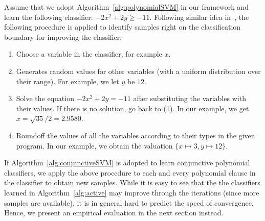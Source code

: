 Assume that we adopt Algorithm~\ref{alg:polynomialSVM} in our framework and learn the following classifier: $-2x^2+2y \geq -11$. Following similar idea in~\cite{DBLP:conf/icml/OrabonaC11}, the following procedure is applied to identify samples right on the classification boundary for improving the classifier.
\begin{enumerate}
\item Choose a variable in the classifier, for example $x$.
\item Generates random values for other variables (with a uniform distribution over their range). For example, we let $y$ be $12$.
\item Solve the equation $-2x^2+2y = -11$ after substituting the variables with their values. If there is no solution, go back to (1). In our example, we get $x = \sqrt{35}/2 = 2.9580$.
\item Roundoff the values of all the variables according to their types in the given program. In our example, we obtain the valuation $\{x \mapsto 3, y \mapsto 12\}$.
\end{enumerate}
If Algorithm~\ref{alg:conjunctiveSVM} is adopted to learn conjunctive polynomial classifiers, we apply the above procedure to each and every polynomial clause in the classifier to obtain new samples. While it is easy to see that the the classifiers learned in Algorithm~\ref{alg:active} may improve through the iterations (since more samples are available), it is in general hard to predict the speed of convergence. Hence, we present an empirical evaluation in the next section instead. 
%
%
%



